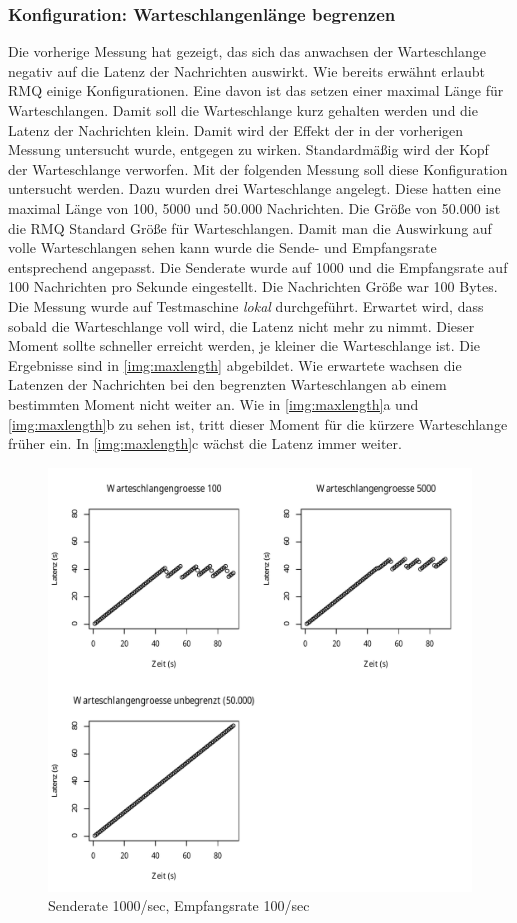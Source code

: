 \subsubsection{Konfiguration: Warteschlangenlänge begrenzen}
\label{sec:maxlength}
Die vorherige Messung hat gezeigt, das sich das anwachsen der Warteschlange negativ auf die Latenz der Nachrichten auswirkt. Wie bereits erwähnt erlaubt RMQ einige Konfigurationen. Eine davon ist das setzen einer maximal Länge für Warteschlangen. Damit soll die Warteschlange kurz gehalten werden und die Latenz der Nachrichten klein. Damit wird der Effekt der in der vorherigen Messung untersucht wurde, entgegen zu wirken. Standardmäßig wird der Kopf der Warteschlange verworfen. Mit der folgenden Messung soll diese Konfiguration untersucht werden. Dazu wurden drei Warteschlange angelegt. Diese hatten eine maximal Länge von 100, 5000 und 50.000 Nachrichten. Die Größe von 50.000 ist die RMQ Standard Größe für Warteschlangen. Damit man die Auswirkung auf volle Warteschlangen sehen kann wurde die Sende- und Empfangsrate entsprechend angepasst. Die Senderate wurde auf 1000 und die Empfangsrate auf 100 Nachrichten pro Sekunde eingestellt. Die Nachrichten Größe war 100 Bytes. Die Messung wurde auf Testmaschine \textit{lokal} durchgeführt. Erwartet wird, dass sobald die Warteschlange voll wird, die Latenz nicht mehr zu nimmt. Dieser Moment sollte schneller erreicht werden, je kleiner die Warteschlange ist.
Die Ergebnisse sind in \autoref{img:maxlength} abgebildet. Wie erwartete wachsen die Latenzen der Nachrichten bei den begrenzten Warteschlangen ab einem bestimmten Moment nicht weiter an. Wie in \autoref{img:maxlength}a und \autoref{img:maxlength}b zu sehen ist, tritt dieser Moment für die kürzere Warteschlange früher ein. In \autoref{img:maxlength}c wächst die Latenz immer weiter.
\begin{figure}
\center
  \includegraphics[width=1\textwidth]{images/measurement/max-length.pdf}
  \caption{Senderate 1000/sec, Empfangsrate 100/sec}
  \label{img:maxlength}
\end{figure}
